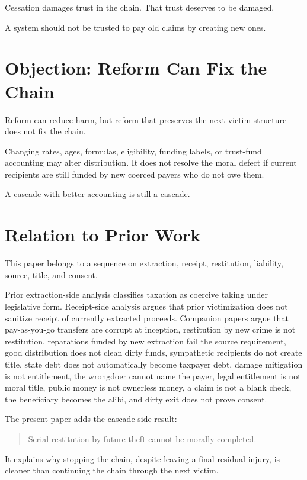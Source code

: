 \documentclass[12pt]{article}
\begin{document}
Cessation damages trust in the chain. That trust deserves to be damaged.

A system should not be trusted to pay old claims by creating new ones.

\section{Objection: Reform Can Fix the Chain}

Reform can reduce harm, but reform that preserves the next-victim structure does not fix the chain.

Changing rates, ages, formulas, eligibility, funding labels, or trust-fund accounting may alter distribution. It does not resolve the moral defect if current recipients are still funded by new coerced payers who do not owe them.

A cascade with better accounting is still a cascade.

\section{Relation to Prior Work}

This paper belongs to a sequence on extraction, receipt, restitution, liability, source, title, and consent.

Prior extraction-side analysis classifies taxation as coercive taking under legislative form. Receipt-side analysis argues that prior victimization does not sanitize receipt of currently extracted proceeds. Companion papers argue that pay-as-you-go transfers are corrupt at inception, restitution by new crime is not restitution, reparations funded by new extraction fail the source requirement, good distribution does not clean dirty funds, sympathetic recipients do not create title, state debt does not automatically become taxpayer debt, damage mitigation is not entitlement, the wrongdoer cannot name the payer, legal entitlement is not moral title, public money is not ownerless money, a claim is not a blank check, the beneficiary becomes the alibi, and dirty exit does not prove consent.

The present paper adds the cascade-side result:

\begin{quote}
Serial restitution by future theft cannot be morally completed.
\end{quote}

It explains why stopping the chain, despite leaving a final residual injury, is cleaner than continuing the chain through the next victim.
\end{document}

